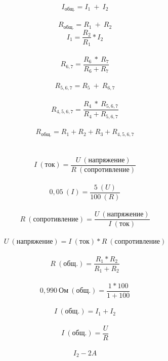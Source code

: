 \documentclass[a4paper]{article}
\begin{document}
	
	\[
	I_{общ.} = {I_{1} \ + \ I_{2}}
	\]
	\\
	\[
	R_{общ.} = {R_{1} \ + \ R_{2}}
	\]
	\[
	I_{1} = \frac{R_{2}} {R_{1}} * I_{2}
	\]
	\\
	\[
	R_{6,7} = \frac{R_{6} \  * \ R_{7}}{R_{6} + R_{7}}
	\]
	\\
	\[
	R_{5,6,7} = {R_{5} \  + \ R_{6,7}}
	\]
	\\
	\[
	R_{4,5,6,7} = \frac{R_{4} \  * \ R_{5,6,7}}{R_{4} + R_{5,6,7}}
	\]
	\\
	\[
	R_{общ.} = {R_{1} + R_{2} + R_{3} + R_{4,5,6,7}}
	\]
	\\
	\\
	\[
	I \ (ток) = \frac{U \ (напряжение)}{R \ (сопротивление)}
	\]
	\\
	\[
	0,05 \ (I) = \frac{5 \ (U)}{100 \ (R)}
	\]
	\\
	\[
	R \ (сопротивление) = \frac{U \ (напряжение)}{I \ (ток)}
	\]
	\\
	\[
	U \ (напряжение) = I \ (ток) * R \ (сопротивление)
	\]
	\\
	\[
	R \ (общ.) = \frac{R_{1} * R_{2}}{R_{1} + R_{2}}
	\]
	\\
	\[
	0,990 \ Ом \ (общ.) = \frac{1 * 100}{1 + 100}
	\]
	\\
	\[
	I \ (общ.) = I_{1} + I_{2}
	\]
	\\
	\[
	I \ (общ.) = \frac{U}{R}
	\]
	\\
	\[
	I_{2} - 2A
	\]
	
	
\end{document}
